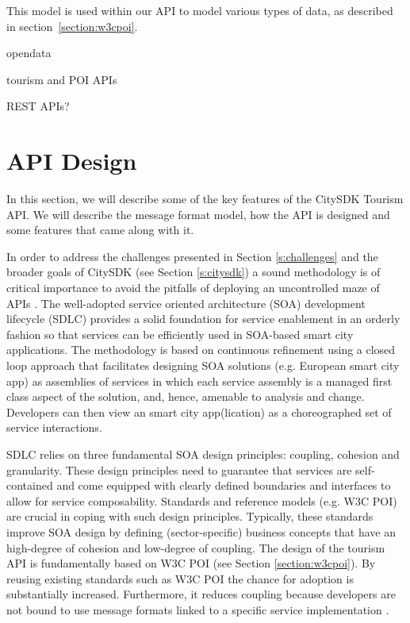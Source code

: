 \documentclass[times]{ettauth}
\begin{document}
This model is used within our API to model various types of data, as described in section~\ref{section:w3cpoi}.

opendata

tourism and POI APIs

REST APIs?


\section{API Design}

In this section, we will describe some of the key features of the CitySDK Tourism API. We will describe the message format model, how the API is designed and some features that came along with it.

In order to address the challenges presented in Section \ref{s:challenges} and the broader goals of CitySDK (see Section \ref{s:citysdk}) a sound methodology is of critical importance to avoid the pitfalls of deploying an uncontrolled maze of APIs \cite{papazoglou2007,monsieur2012}. The well-adopted service oriented architecture (SOA) development lifecycle (SDLC) \cite{papazoglou2007} provides a solid foundation for service enablement in an orderly fashion so that services can be efficiently used in SOA-based smart city applications. The methodology is based on continuous refinement using a closed loop approach that facilitates designing SOA solutions (e.g. European smart city app) as assemblies of services in which each service assembly is a managed first class aspect of the solution, and, hence, amenable to analysis and change. Developers can then view an smart city app(lication) as a choreographed set of service interactions.

SDLC relies on three fundamental SOA design principles: coupling, cohesion and granularity. These design principles need to guarantee that services are self-contained and come equipped with clearly defined boundaries and interfaces to allow for service composability. Standards and reference models (e.g. W3C POI) are crucial in coping with such design principles. Typically, these standards improve SOA design by defining (sector-specific) business concepts that have an high-degree of cohesion and low-degree of coupling. The design of the tourism API is fundamentally based on W3C POI (see Section \ref{section:w3cpoi}). By reusing existing standards such as W3C POI the chance for adoption is substantially increased. Furthermore, it reduces coupling because developers are not bound to use message formats linked to a specific service implementation \cite{papazoglou2007}.
\end{document}
